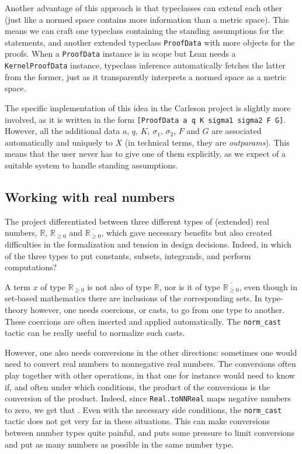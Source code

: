 \documentclass[12pt]{amsart}
\newcommand*{\real}{\mathbb{R}} %
\newcommand{\nnreal}{\real_{\ge0}}
\newcommand{\ennreal}{\overline{\real_{\ge0}}}
\theoremstyle{definition}
\theoremstyle{plain}
\begin{document}
Another advantage of this approach is that typeclasses can extend each other
(just like a normed space contains more information than a metric space).
This means we can craft one typeclass containing the standing assumptions for
the statements, and another extended typeclass \texttt{ProofData} with more
objects for the proofs. When a \texttt{ProofData} instance is in scope but
Lean needs a \texttt{KernelProofData} instance, typeclass inference
automatically fetches the latter from the former, just as it transparently
interprets a normed space as a metric space.

The specific implementation of this idea in the Carleson project is slightly
more involved, as it is written in the form \texttt{[ProofData a q K sigma1
sigma2 F G]}. However, all the additional data $a$, $q$, $K$, $\sigma_1$,
$\sigma_2$, $F$ and $G$ are associated automatically and uniquely to $X$ (in
technical terms, they are \emph{outparams}). This means that the user never
has to give one of them explicitly, as we expect of a suitable system to
handle standing assumptions.


\subsection{Working with real numbers}\label{subsec:real}

The project differentiated between three different types of (extended) real numbers, $\real$, $\nnreal$ and $\ennreal$,
which gave necessary benefits but also created difficulties in the formalization
and tension in design decisions.
Indeed, in which of the three types to put constants,
subsets, integrands, and perform computations?

A term $x$ of type $\nnreal$ is not also of type $\real$, nor is it of type $\ennreal$, even though in set-based mathematics there are inclusions of the corresponding sets. In type-theory however, one needs coercions, or casts, to go from one type to another. These coercions are often inserted and applied automatically.
The \texttt{norm\_cast} tactic can be really useful to normalize such casts.

However, one also needs conversions in the other directions: sometimes one would need to convert real numbers to nonnegative real numbers. The conversions often play together with other operations, in that one for instance would need to know if, and often under which conditions, the product of the conversions is the conversion of the product. Indeed, since \texttt{Real.toNNReal} maps negative numbers to zero, we get that
.
Even with the necessary side conditions, the \texttt{norm\_cast} tactic does not get very far
in these situations.
This can make conversions between number types quite painful,
and puts some pressure to limit conversions and put as many numbers as possible in the same number type.
\end{document}
